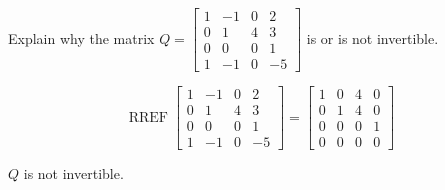 
\begin{exerciseStatement}


Explain why the matrix \(Q= \left[\begin{array}{cccc}
1 & -1 & 0 & 2 \\
0 & 1 & 4 & 3 \\
0 & 0 & 0 & 1 \\
1 & -1 & 0 & -5
\end{array}\right] \) is or is not invertible.


\end{exerciseStatement}
    
\begin{exerciseAnswer} 


\[\operatorname{RREF} \left[\begin{array}{cccc}
1 & -1 & 0 & 2 \\
0 & 1 & 4 & 3 \\
0 & 0 & 0 & 1 \\
1 & -1 & 0 & -5
\end{array}\right] = \left[\begin{array}{cccc}
1 & 0 & 4 & 0 \\
0 & 1 & 4 & 0 \\
0 & 0 & 0 & 1 \\
0 & 0 & 0 & 0
\end{array}\right] \]

\(Q\) is not invertible.
\end{exerciseAnswer}
    

